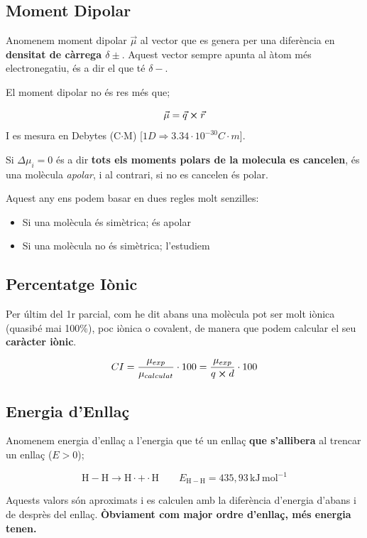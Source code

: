 \documentclass[12pt]{article}
\begin{document}
\subsection{Moment Dipolar}

Anomenem moment dipolar $\vec{\mu}$ al vector que es genera per una diferència en \textbf{densitat de càrrega $\delta \pm$}. Aquest vector sempre apunta al àtom més electronegatiu, és a dir el que té $\delta -$.

El moment dipolar no és res més que;

\[\vec{\mu} = \vec{q} \cross \vec{r}\] I es mesura en Debytes (C$\cdot$M) [$1D \Rightarrow 3.34\cdot 10^{-30} C\cdot m$].

Si $\Delta \mu_i = 0$ és a dir \textbf{tots els moments polars de la molecula es cancelen}, és una molècula \textit{apolar}, i al contrari, si no es cancelen és polar.

Aquest any ens podem basar en dues regles molt senzilles:

\begin{itemize}
    \item Si una molècula és simètrica; és apolar
    \item Si una molècula no és simètrica; l'estudiem
\end{itemize}

\subsection{Percentatge Iònic}

Per últim del 1r parcial, com he dit abans una molècula pot ser molt iònica (quasibé mai 100\%), poc iònica o covalent, de manera que podem calcular el seu \textbf{caràcter iònic}.

\[CI = \frac{\mu_{exp}}{\mu_{calculat}} \cdot 100 = \frac{\mu_{exp}}{q \cross d} \cdot 100 \]

\subsection{Energia d'Enllaç}

Anomenem energia d'enllaç a l'energia que té un enllaç \textbf{que s'allibera} al trencar un enllaç ($E>0$);

\[
\mathrm{H-H} \longrightarrow \mathrm{H\cdot + \cdot H}
\qquad
E_{\mathrm{H-H}} = 435{,}93\,\mathrm{kJ\,mol^{-1}}
\]

Aquests valors són aproximats i es calculen amb la diferència d'energia d'abans i de desprès del enllaç. \textbf{Òbviament com major ordre d'enllaç, més energia tenen.}
\end{document}
